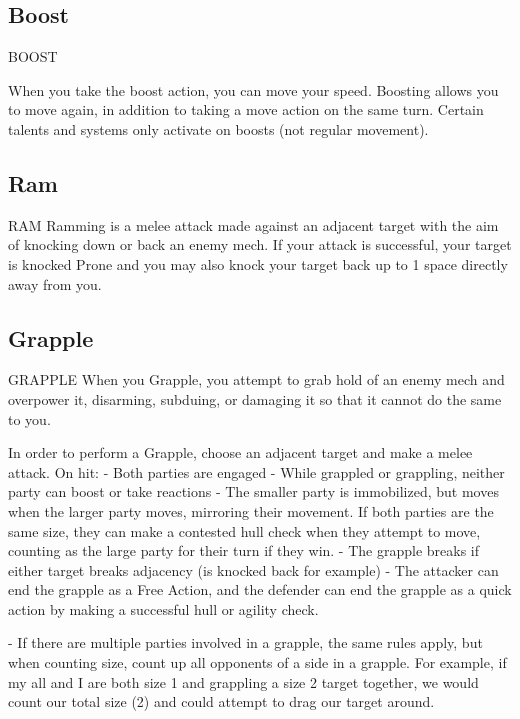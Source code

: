 \subsection{Boost}

                                                BOOST

When you take the boost action, you can move your speed. Boosting allows you to move again,
in addition to taking a move action on the same turn. Certain talents and systems only activate
on boosts (not regular movement).

\subsection{Ram}

                                                 RAM
Ramming is a melee attack made against an adjacent target with the aim of knocking down or
back an enemy mech.
If your attack is successful, your target is knocked Prone and you may also knock your target
back up to 1 space directly away from you.
\subsection{Grapple}

                                              GRAPPLE
When you Grapple, you attempt to grab hold of an enemy mech and overpower it, disarming,
subduing, or damaging it so that it cannot do the same to you.

In order to perform a Grapple, choose an adjacent target and make a melee attack. On hit:
    -   Both parties are engaged
    -   While grappled or grappling, neither party can boost or take reactions
    -   The smaller party is immobilized, but moves when the larger party moves, mirroring their
        movement. If both parties are the same size, they can make a contested hull check when
        they attempt to move, counting as the large party for their turn if they win.
    -   The grapple breaks if either target breaks adjacency (is knocked back for example)
    -   The attacker can end the grapple as a Free Action, and the defender can end the grapple
        as a quick action by making a successful hull or agility check.




    -    If there are multiple parties involved in a grapple, the same rules apply, but when counting
         size, count up all opponents of a side in a grapple. For example, if my all and I are both
         size 1 and grappling a size 2 target together, we would count our total size (2) and could
         attempt to drag our target around.
